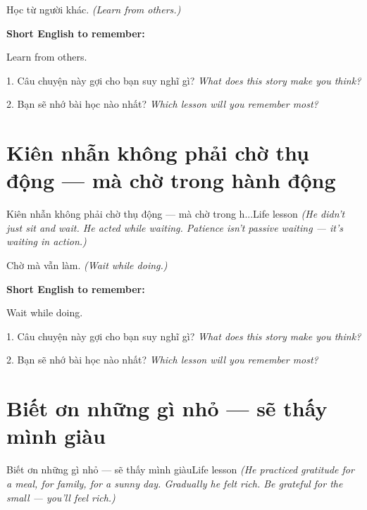 \begin{baihoc}
Học từ người khác.
\textit{(Learn from others.)}
\end{baihoc}

\begin{ghinhoanh}
\textbf{Short English to remember:}

Learn from others.

\end{ghinhoanh}

\begin{tuhocnhanh}
1. Câu chuyện này gợi cho bạn suy nghĩ gì? \textit{What does this story make you think?}

2. Bạn sẽ nhớ bài học nào nhất? \textit{Which lesson will you remember most?}
\end{tuhocnhanh}
\ngancach


\section{Kiên nhẫn không phải chờ thụ động — mà chờ trong hành động}
\begin{truyen}{Kiên nhẫn không phải chờ thụ động — mà chờ trong h...}{Life lesson}
\textit{(He didn't just sit and wait. He acted while waiting. Patience isn't passive waiting — it's waiting in action.)}
\end{truyen}

\begin{baihoc}
Chờ mà vẫn làm.
\textit{(Wait while doing.)}
\end{baihoc}

\begin{ghinhoanh}
\textbf{Short English to remember:}

Wait while doing.

\end{ghinhoanh}

\begin{tuhocnhanh}
1. Câu chuyện này gợi cho bạn suy nghĩ gì? \textit{What does this story make you think?}

2. Bạn sẽ nhớ bài học nào nhất? \textit{Which lesson will you remember most?}
\end{tuhocnhanh}
\ngancach


\section{Biết ơn những gì nhỏ — sẽ thấy mình giàu}
\begin{truyen}{Biết ơn những gì nhỏ — sẽ thấy mình giàu}{Life lesson}
\textit{(He practiced gratitude for a meal, for family, for a sunny day. Gradually he felt rich. Be grateful for the small — you'll feel rich.)}
\end{truyen}

